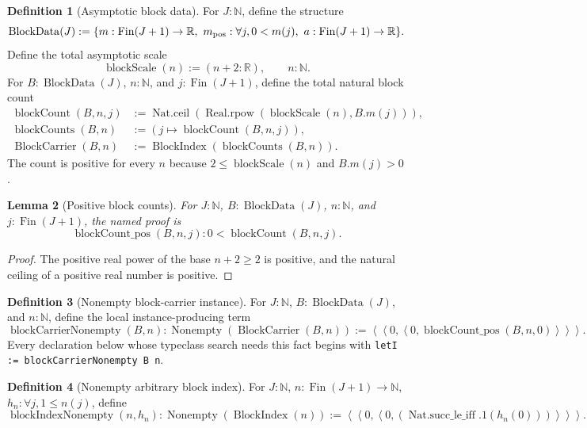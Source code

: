 \documentclass[9pt]{extarticle}
\newtheorem{lemma}{Lemma}[section]
\theoremstyle{definition}
\newtheorem{definition}[lemma]{Definition}
\theoremstyle{remark}
\newcommand{\R}{\mathbb R}
\newcommand{\N}{\mathbb N}
\begin{document}
\begin{definition}[Asymptotic block data]
\label{def:block-data}
For $J:\N$, define the structure
\[
 \operatorname{BlockData}(J):=
 \{m:\operatorname{Fin}(J+1)\to\R,\ 
   m_{\rm pos}:\forall j,0<m(j),\
   a:\operatorname{Fin}(J+1)\to\R\}.
\]
Define the total asymptotic scale
\[
 \operatorname{blockScale}(n):=(n+2:\R),\qquad n:\N.
\]
For $B:\operatorname{BlockData}(J)$, $n:\N$, and
$j:\operatorname{Fin}(J+1)$, define the total natural block count
\begin{align*}
 \operatorname{blockCount}(B,n,j)
 &:=\operatorname{Nat.ceil}
    (\operatorname{Real.rpow}(\operatorname{blockScale}(n),B.m(j))),\\
 \operatorname{blockCounts}(B,n)&:=(j\mapsto
    \operatorname{blockCount}(B,n,j)),\\
 \operatorname{BlockCarrier}(B,n)&:=
    \operatorname{BlockIndex}(\operatorname{blockCounts}(B,n)).
\end{align*}
The count is positive for every $n$ because $2\leq\operatorname{blockScale}(n)$
and $B.m(j)>0$.
\end{definition}

\begin{lemma}[Positive block counts]
\label{lem:block-count-pos}
For $J:\N$, $B:\operatorname{BlockData}(J)$, $n:\N$, and
$j:\operatorname{Fin}(J+1)$, the named proof is
\[
 \operatorname{blockCount\_pos}(B,n,j):
 0<\operatorname{blockCount}(B,n,j).
\]
\end{lemma}

\begin{proof}
The positive real power of the base $n+2\geq2$ is positive, and the natural
ceiling of a positive real number is positive.
\end{proof}

\begin{definition}[Nonempty block-carrier instance]
\label{def:block-carrier-nonempty}
For $J:\N$, $B:\operatorname{BlockData}(J)$, and $n:\N$, define the local
instance-producing term
\[
 \operatorname{blockCarrierNonempty}(B,n):
 \operatorname{Nonempty}(\operatorname{BlockCarrier}(B,n))
 :=\left\langle
   \left\langle0,
    \left\langle0,\operatorname{blockCount\_pos}(B,n,0)\right\rangle
   \right\rangle
 \right\rangle.
\]
Every declaration below whose typeclass search needs this fact begins with
\texttt{letI := blockCarrierNonempty B n}.
\end{definition}

\begin{definition}[Nonempty arbitrary block index]
\label{def:block-index-nonempty}
For $J:\N$, $n:\operatorname{Fin}(J+1)\to\N$,
$h_n:\forall j,1\leq n(j)$, define
\[
 \operatorname{blockIndexNonempty}(n,h_n):
  \operatorname{Nonempty}(\operatorname{BlockIndex}(n))
 :=\left\langle
   \left\langle0,\left\langle0,
    (\operatorname{Nat.succ\_le\_iff}.1(h_n(0)))
   \right\rangle\right\rangle
 \right\rangle.
\]
\end{definition}
\end{document}
